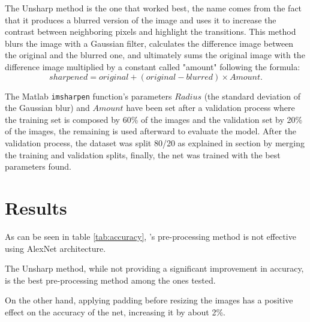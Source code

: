 \documentclass[letterpaper]{article} %
\begin{document}
The Unsharp method is the one that worked best, the name comes from the fact that it produces a blurred version of the image and uses it to increase the contrast between neighboring pixels and highlight the transitions.
This method blurs the image with a Gaussian filter, calculates the difference image between the original and the blurred one, and ultimately sums the original image with the difference image multiplied by a constant called "amount" following the formula:
\begin{equation*}
    sharpened = original + (original - blurred) \times Amount.
\end{equation*}

The Matlab \texttt{imsharpen} function's parameters $Radius$ (the standard deviation of the Gaussian blur) and $Amount$ have been set after a validation process where the training set is composed by 60\% of the images and the validation set by 20\% of the images, the remaining is used afterward to evaluate the model.
After the validation process, the dataset was split 80/20 as explained in section  by merging the training and validation splits, finally, the net was trained with the best parameters found.


\section{Results} \label{sec:results}
As can be seen in table \ref{tab:accuracy}, \citeauthor{hybridPreprocessingDai2017}'s pre-processing method is not effective using AlexNet architecture.

The Unsharp method, while not providing a significant improvement in accuracy, is the best pre-processing method among the ones tested.

On the other hand, applying padding before resizing the images has a positive effect on the accuracy of the net, increasing it by about 2\%.
\end{document}
